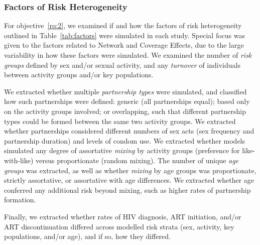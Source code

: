\subsubsection{Factors of Risk Heterogeneity}
\label{sss:meth:factors}
For objective~\ref{rq:2}, we examined if and how
the factors of risk heterogeneity outlined in Table~\ref{tab:factors}
were simulated in each study.
Special focus was given to the factors related to Network and Coverage Effects,
due to the large variability in how these factors were simulated.
We examined the number of \emph{risk groups} defined by sex and/or sexual activity, and
any \emph{turnover} of individuals between activity groups and/or key populations.
\par
We extracted whether multiple \emph{partnership types} were simulated,
and classified how such partnerships were defined:
generic (all partnerships equal);
based only on the activity groups involved;
or overlapping, such that different partnership types could be formed between the same two activity groups.
We extracted whether partnerships considered different
numbers of sex acts (sex frequency and partnership duration) and levels of condom use.
We extracted whether models simulated any degree of assortative \emph{mixing} by activity groups
(preference for like-with-like) versus proportionate (random mixing). 
The number of unique \emph{age groups} was extracted, as well as
whether \emph{mixing} by age groups was
proportionate, strictly assortative, or assortative with age differences.
We extracted whether age conferred any additional risk beyond mixing,
such as higher rates of partnership formation.
\par
Finally, we extracted whether rates of HIV diagnosis, ART initiation, and/or ART discontinuation
differed across modelled risk strata (sex, activity, key populations, and/or age),
and if so, how they differed.
